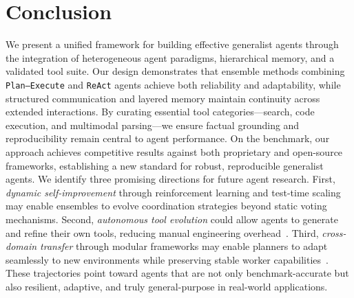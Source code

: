 \section{Conclusion}
We present a unified framework for building effective generalist agents through the integration of heterogeneous agent paradigms, hierarchical memory, and a validated tool suite. Our design demonstrates that ensemble methods combining \texttt{Plan–Execute} and \texttt{ReAct} agents achieve both reliability and adaptability, while structured communication and layered memory maintain continuity across extended interactions. By curating essential tool categories—search, code execution, and multimodal parsing—we ensure factual grounding and reproducibility remain central to agent performance. On the \gaia{} benchmark, our approach achieves competitive results against both proprietary and open-source frameworks, establishing a new standard for robust, reproducible generalist agents.
We identify three promising directions for future agent research. First, \emph{dynamic self-improvement} through reinforcement learning and test-time scaling may enable ensembles to evolve coordination strategies beyond static voting mechanisms. Second, \emph{autonomous tool evolution} could allow agents to generate and refine their own tools, reducing manual engineering overhead~\cite{qiu2025alita}. Third, \emph{cross-domain transfer} through modular frameworks may enable planners to adapt seamlessly to new environments while preserving stable worker capabilities~\cite{owl2025}. These trajectories point toward agents that are not only benchmark-accurate but also resilient, adaptive, and truly general-purpose in real-world applications.